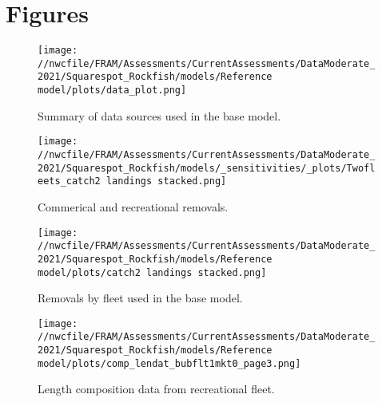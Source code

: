 \documentclass[11pt,
  english,
  a4paper,
]{article}
\begin{document}
\newpage

\clearpage


\hypertarget{figures}{%
\section{Figures}\label{figures}}

\leavevmode\tagmcend\tagstructend


\begin{figure}
\centering
\texttt{[image: //nwcfile/FRAM/Assessments/CurrentAssessments/DataModerate\_2021/Squarespot\_Rockfish/models/Reference model/plots/data\_plot.png]}
\caption{Summary of data sources used in the base model.\label{fig:data-plot}}
\end{figure}

\tagmcend\tagstructend


\begin{figure}
\centering
\texttt{[image: //nwcfile/FRAM/Assessments/CurrentAssessments/DataModerate\_2021/Squarespot\_Rockfish/models/\_sensitivities/\_plots/Twofleets\_catch2 landings stacked.png]}
\caption{Commerical and recreational removals.\label{fig:twofleetcatch}}
\end{figure}

\tagmcend\tagstructend


\begin{figure}
\centering
\texttt{[image: //nwcfile/FRAM/Assessments/CurrentAssessments/DataModerate\_2021/Squarespot\_Rockfish/models/Reference model/plots/catch2 landings stacked.png]}
\caption{Removals by fleet used in the base model.\label{fig:catch}}
\end{figure}

\tagmcend\tagstructend


\begin{figure}
\centering
\texttt{[image: //nwcfile/FRAM/Assessments/CurrentAssessments/DataModerate\_2021/Squarespot\_Rockfish/models/Reference model/plots/comp\_lendat\_bubflt1mkt0\_page3.png]}
\caption{Length composition data from recreational fleet.\label{fig:rec-len-data}}
\end{figure}
\end{document}
